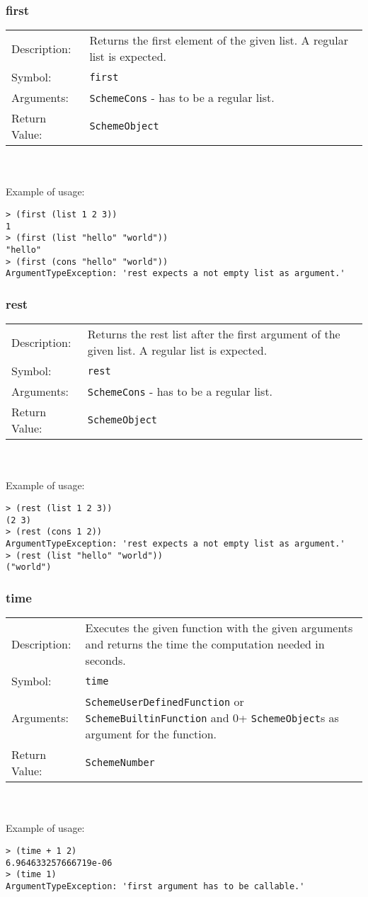 \documentclass[12pt,a4paper]{scrartcl}
\begin{document}
\subsubsection{first}
\begin{tabular}{l  p{13cm}}
Description: & Returns the first element of the given list. A regular list is expected.\\
Symbol: & \lstinline{first}\\
Arguments: & \lstinline{SchemeCons} - has to be a regular list.\\
Return Value: & \lstinline{SchemeObject}
\end{tabular}
\\
\\
Example of usage:
\begin{lstlisting}
> (first (list 1 2 3))
1
> (first (list "hello" "world"))
"hello"
> (first (cons "hello" "world"))
ArgumentTypeException: 'rest expects a not empty list as argument.' 
\end{lstlisting}

\subsubsection{rest}
\begin{tabular}{l  p{13cm}}
Description: & Returns the rest list after the first argument of the given list. A regular list is expected.\\
Symbol: & \lstinline{rest}\\
Arguments: & \lstinline{SchemeCons} - has to be a regular list.\\
Return Value: & \lstinline{SchemeObject}
\end{tabular}
\\
\\
Example of usage:
\begin{lstlisting}
> (rest (list 1 2 3))
(2 3)
> (rest (cons 1 2))
ArgumentTypeException: 'rest expects a not empty list as argument.'  
> (rest (list "hello" "world"))
("world")
\end{lstlisting}



\subsubsection{time}
\begin{tabular}{l  p{13cm}}
Description: & Executes the given function with the given arguments and returns the time the computation needed in seconds.\\
Symbol: & \lstinline{time}\\
Arguments: & \lstinline{SchemeUserDefinedFunction} or \lstinline{SchemeBuiltinFunction} and 0+ \lstinline{SchemeObject}s as argument for the function.\\
Return Value: & \lstinline{SchemeNumber}
\end{tabular}
\\
\\
Example of usage:
\begin{lstlisting}
> (time + 1 2)
6.964633257666719e-06
> (time 1)
ArgumentTypeException: 'first argument has to be callable.'
\end{lstlisting}
\end{document}

